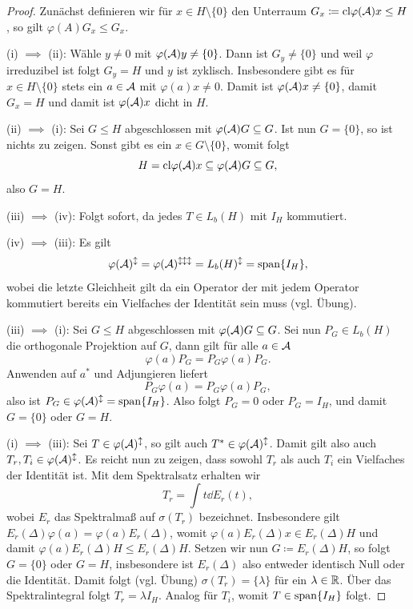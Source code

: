 \begin{proof}
    Zunächst definieren wir für $x \in H \setminus \{ 0 \}$ den Unterraum $G_x \coloneqq \mathrm{cl} \varphi(\mathcal{A})x \leq H$, so gilt $\varphi(A) G_x \leq G_x$.

    (i) $\implies$ (ii): Wähle $y \neq 0$ mit $\varphi(\mathcal{A}) y \neq \{ 0 \}$. Dann ist $G_y \neq \{ 0 \}$ und weil $\varphi$ irreduzibel ist folgt $G_y = H$ und $y$ ist zyklisch. Insbesondere gibt es für $x \in H \setminus \{0\}$ stets ein $a \in \mathcal{A}$ mit $\varphi(a) x \neq 0$. Damit ist $\varphi(\mathcal{A}) x \neq \{0\}$, damit $G_x = H$ und damit ist $\varphi(\mathcal{A}) x$ dicht in $H$.

    (ii) $\implies$ (i): Sei $G \leq H$ abgeschlossen mit $\varphi(\mathcal{A}) G \subseteq G$. Ist nun $G = \{0\}$, so ist nichts zu zeigen. Sonst gibt es ein $x \in G \setminus \{0\}$, womit folgt
    \[
        H = \mathrm{cl} \varphi(\mathcal{A}) x \subseteq \varphi(\mathcal{A}) G \subseteq G,
    \]
    also $G = H$.

    (iii) $\implies$ (iv): Folgt sofort, da jedes $T \in L_b(H)$ mit $I_H$ kommutiert.

    (iv) $\implies$ (iii): Es gilt
    \[
        \varphi(\mathcal{A})^{\updownarrow} = \varphi(\mathcal{A})^{\updownarrow\updownarrow\updownarrow} = L_b(H)^{\updownarrow} = \mathrm{span} \{ I_H \},
    \]
    wobei die letzte Gleichheit gilt da ein Operator der mit jedem Operator kommutiert bereits ein Vielfaches der Identität sein muss (vgl. Übung).

    (iii) $\implies$ (i): Sei $G \leq H$ abgeschlossen mit $\varphi(\mathcal{A}) G \subseteq G$. Sei nun $P_G \in L_b(H)$ die orthogonale Projektion auf $G$, dann gilt für alle $a \in \mathcal{A}$
    \[
        \varphi(a) P_G = P_G \varphi(a) P_G.
    \]
    Anwenden auf $a^*$ und Adjungieren liefert
    \[
        P_G \varphi(a) = P_G \varphi(a) P_G,
    \]
    also ist $P_G \in \varphi(\mathcal{A})^{\updownarrow} = \mathrm{span} \{ I_H \}$. Also folgt $P_G = 0$ oder $P_G = I_H$, und damit $G = \{0\}$ oder $G = H$.

    (i) $\implies$ (iii): Sei $T \in \varphi(\mathcal{A})^\updownarrow$, so gilt auch $T^* \in \varphi(\mathcal{A})^\updownarrow$. Damit gilt also auch $T_r, T_i \in \varphi(\mathcal{A})^\updownarrow$. Es reicht nun zu zeigen, dass sowohl $T_r$ als auch $T_i$ ein Vielfaches der Identität ist. Mit dem Spektralsatz erhalten wir
    \[
        T_r = \int t \dd E_r(t),
    \]
    wobei $E_r$ das Spektralmaß auf $\sigma(T_r)$ bezeichnet. Insbesondere gilt $E_r(\Delta) \varphi(a) = \varphi(a) E_r(\Delta)$, womit $\varphi(a) E_r(\Delta) x \in E_r(\Delta) H$ und damit $\varphi(a) E_r(\Delta) H \leq E_r(\Delta) H$. Setzen wir nun $G \coloneqq E_r(\Delta) H$, so folgt $G = \{0\}$ oder $G = H$, insbesondere ist $E_r(\Delta)$ also entweder identisch Null oder die Identität. Damit folgt (vgl. Übung) $\sigma(T_r) = \{ \lambda \}$ für ein $\lambda \in \mathbb{R}$. Über das Spektralintegral folgt $T_r = \lambda I_H$. Analog für $T_i$, womit $T \in \mathrm{span} \{ I_H \}$ folgt.


\end{proof}
